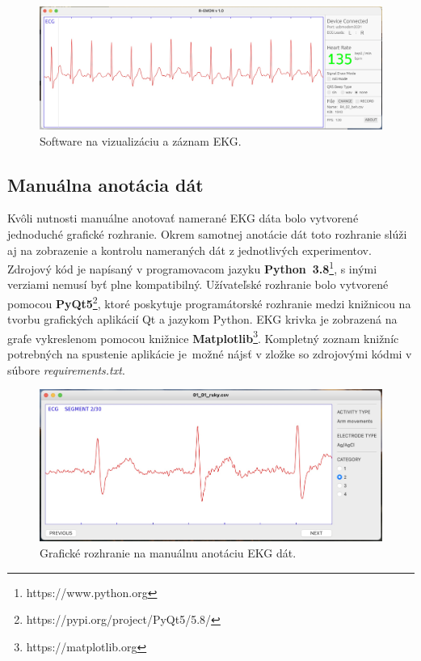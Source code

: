 \begin{figure}[H]
    \centering
    \includegraphics[scale=0.172]{img/recording_sw.jpeg}
    \caption{Software na vizualizáciu a záznam EKG.}
    \label{fig:SW_recording}
\end{figure}

\subsection{Manuálna anotácia dát}

Kvôli nutnosti manuálne anotovať namerané EKG dáta bolo vytvorené jednoduché grafické rozhranie. Okrem samotnej anotácie dát toto rozhranie slúži aj na zobrazenie a kontrolu nameraných dát z jednotlivých experimentov. Zdrojový kód je napísaný v programovacom jazyku \textbf{Python~3.8}\footnote{https://www.python.org}, s inými verziami nemusí byť plne kompatibilný. Užívateľské rozhranie bolo vytvorené pomocou \textbf{PyQt5}\footnote{https://pypi.org/project/PyQt5/5.8/}, ktoré poskytuje programátorské rozhranie medzi knižnicou na tvorbu grafických aplikácií Qt a jazykom Python. EKG krivka je zobrazená na grafe vykreslenom pomocou knižnice \textbf{Matplotlib}\footnote{https://matplotlib.org}. Kompletný zoznam knižníc potrebných na spustenie aplikácie je~možné nájsť v zložke so zdrojovými kódmi v súbore \textit{requirements.txt}.

\begin{figure}[H]
    \centering
    \includegraphics[scale=0.215]{img/annotation_sw.jpeg}
    \caption{Grafické rozhranie na manuálnu anotáciu EKG dát.}
    \label{fig:SW_labels}
\end{figure}

